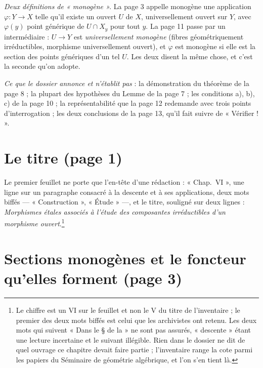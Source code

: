 \documentclass[11pt,a4paper]{article}
\begin{document}
\emph{Deux définitions de « monogène ».} La page 3 appelle monogène une
application $\varphi : Y \to X$ telle qu'il existe un ouvert $U$ de $X$,
universellement ouvert sur $Y$, avec $\varphi(y)$ point générique de
$U \cap X_y$ pour tout $y$. La page 11 passe par un intermédiaire :
$U \to Y$ est \emph{universellement monogène} (fibres géométriquement
irréductibles, morphisme universellement ouvert), et $\varphi$ est monogène si
elle est la section des points génériques d'un tel $U$. Les deux disent la même
chose, et c'est la seconde qu'on adopte.

\emph{Ce que le dossier annonce et n'établit pas} : la démonstration du
théorème de la page 8 ; la plupart des hypothèses du Lemme de la page 7 ; les
conditions a), b), c) de la page 10 ; la représentabilité que la page 12
redemande avec trois points d'interrogation ; les deux conclusions de la page
13, qu'il fait suivre de « Vérifier ! ».

\section*{Le titre (page 1)}

Le premier feuillet ne porte que l'en-tête d'une rédaction : « Chap.\ VI »,
une ligne sur un paragraphe consacré à la descente et à ses applications, deux
mots biffés --- « Construction », « Étude » ---, et le titre, souligné sur deux
lignes : \emph{Morphismes étales associés à l'étude des composantes
irréductibles d'un morphisme ouvert}.\footnote{Le chiffre est un VI sur le
feuillet et non le V du titre de l'inventaire ; le premier des deux mots biffés
est celui que les archivistes ont retenu. Les deux mots qui suivent « Dans le
§ de la » ne sont pas assurés, « descente » étant une lecture incertaine et le
suivant illégible. Rien dans le dossier ne dit de quel ouvrage ce chapitre
devait faire partie ; l'inventaire range la cote parmi les papiers du Séminaire
de géométrie algébrique, et l'on s'en tient là.}

\section*{Sections monogènes et le foncteur qu'elles forment (page 3)}
\end{document}
